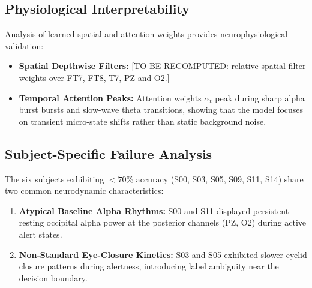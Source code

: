 \documentclass[conference]{IEEEtran}
\begin{document}
\subsection{Physiological Interpretability}
Analysis of learned spatial and attention weights provides neurophysiological validation:
\begin{itemize}[leftmargin=*]
    \item \textbf{Spatial Depthwise Filters:} [TO BE RECOMPUTED: relative spatial-filter weights over FT7, FT8, T7, PZ and O2.]
    \item \textbf{Temporal Attention Peaks:} Attention weights $\alpha_t$ peak during sharp alpha burst bursts and slow-wave theta transitions, showing that the model focuses on transient micro-state shifts rather than static background noise.
\end{itemize}

\subsection{Subject-Specific Failure Analysis}
The six subjects exhibiting $<70\%$ accuracy (S00, S03, S05, S09, S11, S14) share two common neurodynamic characteristics:
\begin{enumerate}[leftmargin=*]
    \item \textbf{Atypical Baseline Alpha Rhythms:} S00 and S11 displayed persistent resting occipital alpha power at the posterior channels ($\text{PZ}$, $\text{O2}$) during active alert states. %
    \item \textbf{Non-Standard Eye-Closure Kinetics:} S03 and S05 exhibited slower eyelid closure patterns during alertness, introducing label ambiguity near the decision boundary.
\end{enumerate}
\end{document}
